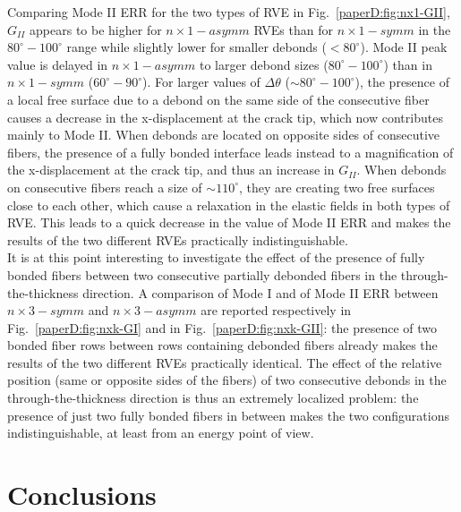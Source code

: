 Comparing Mode II ERR for the two types of RVE in Fig.~\ref{paperD:fig:nx1-GII}, $G_{II}$ appears to be higher for $n \times 1 - asymm$ RVEs than for $n \times 1-symm$ in the $80^{\circ}-100^{\circ}$ range while slightly lower for smaller debonds ($<80^{\circ}$). Mode II peak value is delayed in $n \times 1 - asymm$ to larger debond sizes ($80^{\circ}-100^{\circ}$) than in $n \times 1-symm$ ($60^{\circ}-90^{\circ}$). For larger values of $\Delta\theta$ ($\sim80^{\circ}-100^{\circ}$), the presence of a local free surface due to a debond on the same side of the consecutive fiber causes a decrease in the x-displacement at the crack tip, which now contributes mainly to Mode II. When debonds are located on opposite sides of consecutive fibers, the presence of a fully bonded interface leads instead to a magnification of the x-displacement at the crack tip, and thus an increase in $G_{II}$. When debonds on consecutive fibers reach a size of $\sim110^{\circ}$, they are creating two free surfaces close to each other, which cause a relaxation in the elastic fields in both types of RVE. This leads to a quick decrease in the value of Mode II ERR and makes the results of the two different RVEs practically indistinguishable.\\
It is at this point interesting to investigate the effect of the presence of fully bonded fibers between two consecutive partially debonded fibers in the through-the-thickness direction. A comparison of Mode I and of Mode II ERR between $n \times 3-symm$ and $n \times 3-asymm$ are reported respectively in Fig.~\ref{paperD:fig:nxk-GI} and in Fig.~\ref{paperD:fig:nxk-GII}: the presence of two bonded fiber rows between rows containing debonded fibers already makes the results of the two different RVEs practically identical. The effect of the relative position (same or opposite sides of the fibers) of two consecutive debonds in the through-the-thickness direction is thus an extremely localized problem: the presence of just two fully bonded fibers in between makes the two configurations indistinguishable, at least from an energy point of view.


\section{Conclusions}

